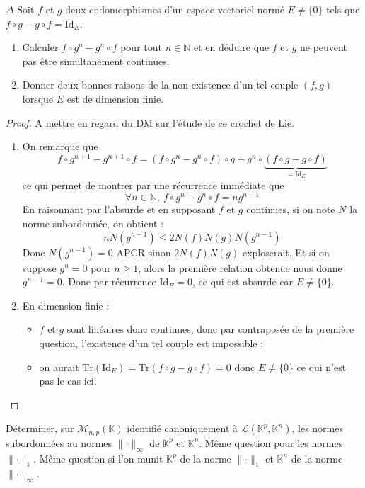 \documentclass[french,a4paper]{article}
\newcommand{\N}{\mathbb{N}}
\newcommand{\K}{\mathbb{K}}
\newcommand{\Tr}{\text{Tr}}
\theoremstyle{plain}
\theoremstyle{definition}
\theoremstyle{remark}
\begin{document}
\begin{ex}{$\Delta$}
	Soit $f$ et $g$ deux endomorphismes d'un espace vectoriel normé $E\ne\{0\}$ tels que $f\circ g-g\circ f=\text{Id}_E$.
	\begin{enumerate}
		\item Calculer $f\circ g^n-g^n\circ f$ pour tout $n\in\N$ et en déduire que $f$ et $g$ ne peuvent pas être simultanément continues.
		\item Donner deux bonnes raisons de la non-existence d'un tel couple $(f,g)$ lorsque $E$ est de dimension finie.
	\end{enumerate}
\end{ex}
\begin{proof}
	A mettre en regard du DM sur l'étude de ce crochet de Lie.
	\begin{enumerate}
		\item On remarque que $$f\circ g^{n+1}-g^{n+1}\circ f=(f\circ g^n-g^n\circ f)\circ g+g^n\circ \underbrace{(f\circ g-g\circ f)}_{=\text{Id}_E}$$ ce qui permet de montrer par une récurrence immédiate que $$\forall n\in\N,\ f\circ g^n-g^n\circ f=ng^{n-1}$$ En raisonnant par l'absurde et en supposant  $f$ et $g$ continues, si on note $N$ la norme subordonnée, on obtient :  $$nN(g^{n-1})\leqslant2N(f)N(g)N(g^{n-1})$$ Donc $N(g^{n-1})=0$ APCR sinon $2N(f)N(g)$ exploserait. Et si on suppose $g^{n}=0$ pour $n\geqslant 1$, alors la première relation obtenue nous donne $g^{n-1}=0$. Donc par récurrence $\text{Id}_E=0$, ce qui est absurde car $E\ne\{0\}$.
		\item En dimension finie :
		\begin{itemize}
			\item $f$ et $g$ sont linéaires donc continues, donc par contraposée de la première question, l'existence d'un tel couple est impossible ;
			\item on aurait $\Tr(\text{Id}_E)=\Tr(f\circ g-g\circ f)=0$ donc $E\ne\{0\}$ ce qui n'est pas le cas ici.
		\end{itemize}
	\end{enumerate}
\end{proof}

\begin{ex}{}
	Déterminer, sur $\mathcal{M}_{n,p}(\K)$ identifié canoniquement à $\mathcal{L}(\K^p,\K^n)$, les normes subordonnées au normes $\lVert\cdot\rVert_\infty$ de $\K^p$ et $\K^n$. Même question pour les normes $\lVert\cdot\rVert_1$. Même question si l'on munit $\K^p$ de la norme $\lVert\cdot\rVert_1$ et $\K^n$ de la norme $\lVert\cdot\rVert_\infty$.
\end{ex}
\end{document}
